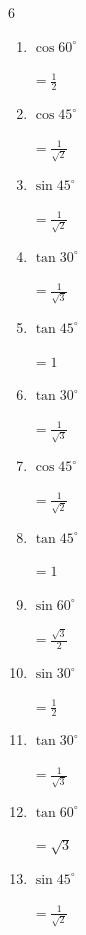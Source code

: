 \begin{multicols}{6}
\begin{enumerate}
  \item $\displaystyle \cos{60^\circ}$

        $\displaystyle =\frac{1}{2}$

  \item $\displaystyle \cos{45^\circ}$

        $\displaystyle =\frac{1}{\sqrt{2}}$

  \item $\displaystyle \sin{45^\circ}$

        $\displaystyle =\frac{1}{\sqrt{2}}$

  \item $\displaystyle \tan{30^\circ}$

        $\displaystyle =\frac{1}{\sqrt{3}}$

  \item $\displaystyle \tan{45^\circ}$

        $\displaystyle =1$

  \item $\displaystyle \tan{30^\circ}$

        $\displaystyle =\frac{1}{\sqrt{3}}$

  \item $\displaystyle \cos{45^\circ}$

        $\displaystyle =\frac{1}{\sqrt{2}}$

  \item $\displaystyle \tan{45^\circ}$

        $\displaystyle =1$

  \item $\displaystyle \sin{60^\circ}$

        $\displaystyle =\frac{\sqrt{3}}{2}$

  \item $\displaystyle \sin{30^\circ}$

        $\displaystyle =\frac{1}{2}$

  \item $\displaystyle \tan{30^\circ}$

        $\displaystyle =\frac{1}{\sqrt{3}}$

  \item $\displaystyle \tan{60^\circ}$

        $\displaystyle =\sqrt{3}$

  \item $\displaystyle \sin{45^\circ}$

        $\displaystyle =\frac{1}{\sqrt{2}}$


\end{enumerate}
\end{multicols}

